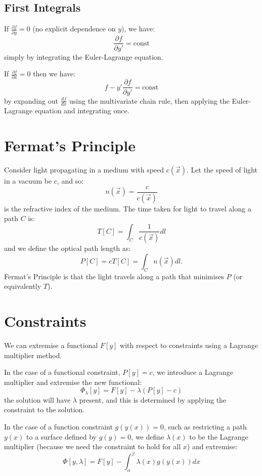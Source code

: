 \documentclass[../Main.tex]{subfiles}
\begin{document}
\subsection{First Integrals}
If $\frac{\partial f}{\partial y} = 0$ (no explicit dependence on $y$), we have:
\begin{equation*}
    \frac{\partial f}{\partial y'} = \text{const}
\end{equation*}
simply by integrating the Euler-Lagrange equation.

If $\frac{\partial f}{\partial x} = 0$ then we have:
\begin{equation*}
    f - y' \frac{\partial f}{\partial y'} = \text{const}
\end{equation*}
by expanding out $\frac{df}{dx}$ using the multivariate chain rule, then applying the Euler-Lagrange equation and integrating once.
\section{Fermat's Principle}
Consider light propagating in a medium with speed $c(\vec{x})$. Let the speed of light in a vacuum be $c$, and so:
\begin{equation*}
    n(\vec{x}) = \frac{c}{c(\vec{x})}
\end{equation*}
is the refractive index of the medium. The time taken for light to travel along a path $C$ is:
\begin{equation*}
    T[C] = \int_C \frac{1}{c(\vec{x})} dl
\end{equation*}
and we define the optical path length as:
\begin{equation*}
    P[C] = cT[C] = \int_C n(\vec{x}) dl.
\end{equation*}
Fermat's Principle is that the light travels along a path that minimises $P$ (or equivalently $T$).
\section{Constraints}
We can extremise a functional $F[y]$ with respect to constraints using a Lagrange multiplier method.

In the case of a functional constraint, $P[y] = c$, we introduce a Lagrange multiplier and extremise the new functional:
\begin{equation*}
    \Phi_\lambda[y] = F[y] - \lambda (P[y] - c)
\end{equation*}
the solution will have $\lambda$ present, and this is determined by applying the constraint to the solution.

In the case of a function constraint $g(y(x)) = 0$, such as restricting a path $y(x)$ to a surface defined by $g(y) = 0$, we define $\lambda(x)$ to be the Lagrange multiplier (because we need the constraint to hold for all $x$) and extremise:
\begin{equation*}
    \Phi[y, \lambda] = F[y] - \int_{\alpha}^{\beta} \lambda(x) g(y(x)) dx
\end{equation*}
\end{document}
